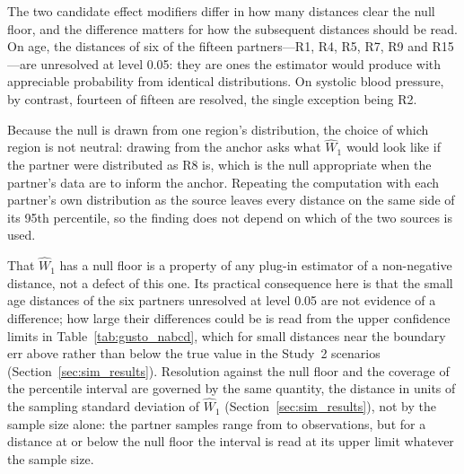 \documentclass[AMA,Times1COL]{WileyNJDv5}
\begin{document}
The two candidate effect modifiers differ in how many distances clear the null floor, and the difference matters for how the subsequent distances should be read. On age, the distances of six of the fifteen partners---R1, R4, R5, R7, R9 and R15---are unresolved at level 0.05: they are ones the estimator would produce with appreciable probability from identical distributions. On systolic blood pressure, by contrast, fourteen of fifteen are resolved, the single exception being R2.

Because the null is drawn from one region's distribution, the choice of which region is not neutral: drawing from the anchor asks what $\widehat{W}_1$ would look like if the partner were distributed as R8 is, which is the null appropriate when the partner's data are to inform the anchor. Repeating the computation with each partner's own distribution as the source leaves every distance on the same side of its 95th percentile, so the finding does not depend on which of the two sources is used.

That $\widehat{W}_1$ has a null floor is a property of any plug-in estimator of a non-negative distance, not a defect of this one. Its practical consequence here is that the small age distances of the six partners unresolved at level 0.05 are not evidence of a difference; how large their differences could be is read from the upper confidence limits in Table~\ref{tab:gusto_nabcd}, which for small distances near the boundary err above rather than below the true value in the Study~2 scenarios (Section~\ref{sec:sim_results}). Resolution against the null floor and the coverage of the percentile interval are governed by the same quantity, the distance in units of the sampling standard deviation of $\widehat{W}_1$ (Section~\ref{sec:sim_results}), not by the sample size alone: the partner samples range from  to  observations, but for a distance at or below the null floor the interval is read at its upper limit whatever the sample size.
\end{document}
